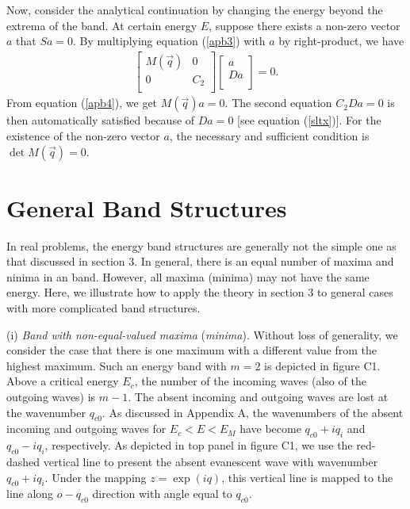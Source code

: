 \documentclass[aps,pra,amsmath,twocolumn,showpacs,bibnotes,10pt]{revtex4-1}
\begin{document}
Now, consider the analytical continuation by changing the energy beyond the extrema of the band. At certain energy $E$, suppose there exists a non-zero vector $a$ that $Sa = 0$. By multiplying equation (\ref{apb3}) with $a$ by right-product, we have
\begin{eqnarray}
\begin{bmatrix}
	M(\vec q)& 0\\
	0&C_2\\
\end{bmatrix}\begin{bmatrix}
	a\\
	Da\\
\end{bmatrix} = 0. 
\label{apb4}
\end{eqnarray}
From equation (\ref{apb4}), we get $M(\vec q)a = 0$. The second equation $C_2Da = 0$ is then automatically satisfied because of $Da = 0$ [see equation (\ref{sltx})]. For the existence of the non-zero vector $a$, the necessary and sufficient condition is $\det M(\vec q) = 0$.

\section{General Band Structures}
\renewcommand{\theequation}{C\arabic{equation}}
\setcounter{equation}{0}

In real problems, the energy band structures are generally not the simple one as that discussed in section 3. In general, there is an equal number of maxima and ninima in an band. However, all maxima (minima) may not have the same energy. Here, we illustrate how to apply the theory in section 3 to general cases with more complicated band structures. 

(i) {\it Band with non-equal-valued maxima} ({\it minima}). Without loss of generality, we consider the case that there is one maximum with a different value from the highest maximum. Such an energy band with $m = 2$ is depicted in figure C1. Above a critical energy $E_c$, the number of the incoming waves (also of the outgoing waves) is $m-1$. The absent incoming and outgoing waves are lost at the wavenumber $q_{c0}$. As discussed in Appendix A, the wavenumbers of the absent incoming and outgoing waves for $E_c < E < E_M$ have become $q_{c0}+iq_i$ and $q_{c0}-iq_i$, respectively. As depicted in top panel in figure C1, we use the red-dashed vertical line to present the absent evanescent wave with wavenumber $q_{c0}+iq_i$. Under the mapping $z = \exp(iq)$, this vertical line is mapped to the line along $o-q_{c0}$ direction with angle equal to $q_{c0}$. 
\end{document}
